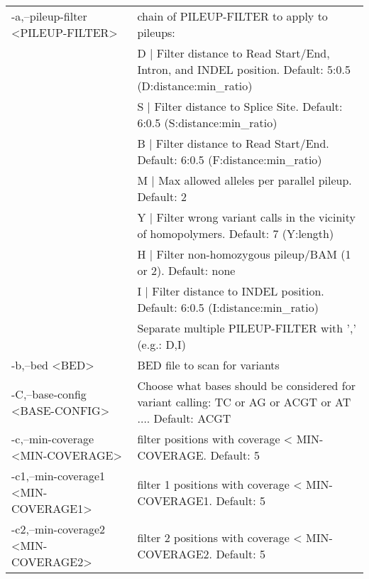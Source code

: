 \documentclass[10pt, a4paper]{article}
\begin{document}
\begin{center}
{\small
\begin{longtable}{p{}p{}}
 -a,--pileup-filter <PILEUP-FILTER>             & chain of PILEUP-FILTER to apply to pileups: \\
                                                & D | Filter distance to Read Start/End, Intron, and INDEL position. Default: 5:0.5 (D:distance:min\_ratio) \\
                                                & S | Filter distance to Splice Site. Default: 6:0.5 (S:distance:min\_ratio) \\
                                                & B | Filter distance to Read Start/End. Default: 6:0.5 (F:distance:min\_ratio) \\
                                                & M | Max allowed alleles per parallel pileup. Default: 2 \\ 
                                                & Y | Filter wrong variant calls in the vicinity of homopolymers. Default: 7 (Y:length) \\
                                                & H | Filter non-homozygous pileup/BAM (1 or 2). Default: none \\
                                                & I | Filter distance to INDEL position. Default: 6:0.5 (I:distance:min\_ratio) \\
                                                & Separate multiple PILEUP-FILTER with ',' (e.g.: D,I) \\
 -b,--bed <BED>									                & BED file to scan for variants \\
 -C,--base-config <BASE-CONFIG> 				        & Choose what bases should be considered for variant calling: TC or AG or ACGT or AT$\ldots$. Default: ACGT \\
 -c,--min-coverage <MIN-COVERAGE>               & filter positions with coverage < MIN-COVERAGE. Default: 5 \\
 -c1,--min-coverage1 <MIN-COVERAGE1>            & filter 1 positions with coverage < MIN-COVERAGE1. Default: 5 \\
 -c2,--min-coverage2 <MIN-COVERAGE2>            & filter 2 positions with coverage < MIN-COVERAGE2. Default: 5 \\

\end{longtable}}
\end{center}
\end{document}
